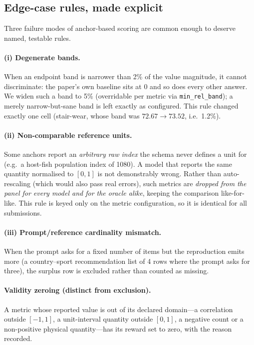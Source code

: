 \subsection{Edge-case rules, made explicit}
\label{sec:edge-rules}
Three failure modes of anchor-based scoring are common enough to deserve named, testable rules.

\paragraph{(i) Degenerate bands.} When an endpoint band is narrower than 2\% of the value magnitude, it cannot discriminate: the paper's own baseline sits at 0 and so does every other answer. We widen such a band to 5\% (overridable per metric via \texttt{min\_rel\_band}); a merely narrow-but-sane band is left exactly as configured. This rule changed exactly one cell (stair-wear, whose band was $72.67\!\to\!73.52$, i.e.\ 1.2\%).

\paragraph{(ii) Non-comparable reference units.} Some anchors report an \emph{arbitrary raw index} the schema never defines a unit for (e.g.\ a host-fish population index of 1080). A model that reports the same quantity normalised to $[0,1]$ is not demonstrably wrong. Rather than auto-rescaling (which would also pass real errors), such metrics are \emph{dropped from the panel for every model and for the oracle alike}, keeping the comparison like-for-like. This rule is keyed only on the metric configuration, so it is identical for all submissions.

\paragraph{(iii) Prompt/reference cardinality mismatch.} When the prompt asks for a fixed number of items but the reproduction emits more (a country--sport recommendation list of 4 rows where the prompt asks for three), the surplus row is excluded rather than counted as missing.

\paragraph{Validity zeroing (distinct from exclusion).} A metric whose reported value is out of its declared domain---a correlation outside $[-1,1]$, a unit-interval quantity outside $[0,1]$, a negative count or a non-positive physical quantity---has its reward set to zero, with the reason recorded.

